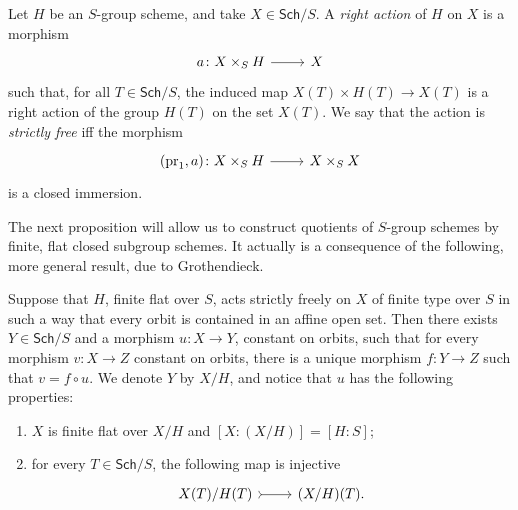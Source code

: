 \begin{defn}
	Let $H$ be an $S$-group scheme, and take $X \in \mathsf{Sch}/S$.
	A \emph{right action} of $H$ on $X$ is a morphism
	\begin{equation*}
	\begin{tikzcd}[row sep = 0ex
		,/tikz/column 1/.append style={anchor=base east}
		,/tikz/column 2/.append style={anchor=base west}]
		a\colon X \times_{ S } H \arrow[r, "", rightarrow] &
		X
	\end{tikzcd}
	\end{equation*} 
	such that, for all $T \in \mathsf{Sch}/S$, the induced map
	$X(T) \times H(T) \to  X(T)$ is a right action of the
	group $H(T)$ on the set $X(T)$.
	We say that the action is \emph{strictly free} iff the morphism
	\begin{equation*}
	\begin{tikzcd}[row sep = 0ex
		,/tikz/column 1/.append style={anchor=base east}
		,/tikz/column 2/.append style={anchor=base west}]
		(\mathrm{pr}_1, a)\colon X \times_{ S } H \arrow[r, "", rightarrow] &
		X \times_{ S } X
	\end{tikzcd}
	\end{equation*} 
	is a closed immersion.
\end{defn}


\noindent
The next proposition will allow us to construct quotients of
$S$-group schemes by finite, flat closed subgroup schemes.
It actually is a consequence of the following, more general result, due to Grothendieck.
\begin{thm}
	Suppose that $H$, finite flat over $S$, acts strictly freely on $X$
	of finite type over $S$ in such a way that every orbit is contained in an affine open set.
	Then there exists $Y \in \mathsf{Sch}/S$ and a morphism $u\colon X \to Y$,
	constant on orbits, such that for every morphism $v\colon X \to Z$ constant on orbits,
	there is a unique morphism $f\colon Y \to Z$ such that $v = f \circ u$.
	We denote $Y$ by $X/H$, and notice that $u$ has the following properties:
\begin{enumerate}
	\item $X$ is finite flat over $X/H$ and $[X:(X/H)] = [H:S]$;
		
	\item for every $T \in \mathsf{Sch}/S$, the following map is injective
		\begin{equation*}
		\begin{tikzcd}
			X(T)/H(T) \arrow[r, "", rightarrowtail] &
			(X/H)(T)
		.\end{tikzcd}
		\end{equation*}
\end{enumerate}
\end{thm}


